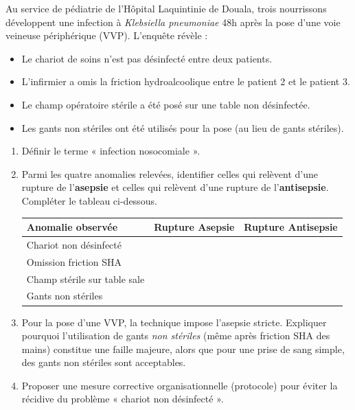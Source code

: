 \documentclass[11pt]{article}
\begin{document}
\begin{exercice}
Au service de pédiatrie de l'Hôpital Laquintinie de Douala, trois nourrissons développent une infection à \textit{Klebsiella pneumoniae} 48h après la pose d'une voie veineuse périphérique (VVP). L'enquête révèle :
\begin{itemize}
    \item Le chariot de soins n'est pas désinfecté entre deux patients.
    \item L'infirmier a omis la friction hydroalcoolique entre le patient 2 et le patient 3.
    \item Le champ opératoire stérile a été posé sur une table non désinfectée.
    \item Les gants non stériles ont été utilisés pour la pose (au lieu de gants stériles).
\end{itemize}
\begin{enumerate}
    \item Définir le terme « infection nosocomiale ».
    \item Parmi les quatre anomalies relevées, identifier celles qui relèvent d'une rupture de l'\textbf{asepsie} et celles qui relèvent d'une rupture de l'\textbf{antisepsie}. Compléter le tableau ci-dessous.
    \begin{center}
    \begin{tabular}{|p{5cm}|c|c|}
    \hline
    \textbf{Anomalie observée} & \textbf{Rupture Asepsie} & \textbf{Rupture Antisepsie} \\
    \hline
    Chariot non désinfecté & & \\
    \hline
    Omission friction SHA & & \\
    \hline
    Champ stérile sur table sale & & \\
    \hline
    Gants non stériles & & \\
    \hline
    \end{tabular}
    \end{center}
    \item Pour la pose d'une VVP, la technique impose l'asepsie stricte. Expliquer pourquoi l'utilisation de gants \textit{non stériles} (même après friction SHA des mains) constitue une faille majeure, alors que pour une prise de sang simple, des gants non stériles sont acceptables.
    \item Proposer une mesure corrective organisationnelle (protocole) pour éviter la récidive du problème « chariot non désinfecté ».
\end{enumerate}
\end{exercice}
\end{document}
